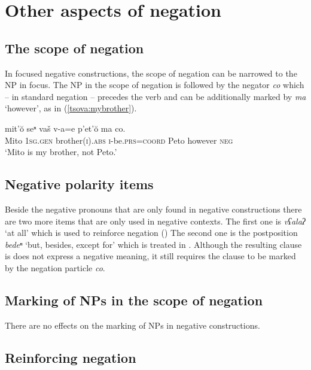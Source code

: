 \documentclass[output=paper,%
colorlinks,citecolor=brown,
showindex
]{langscibook}
\begin{document}
\section{Other aspects of negation}
\label{tsova:otheraspects}
\subsection{The scope of negation}
\label{tsova:scope}

In focused negative constructions, the scope of negation can be narrowed to the NP in focus. The NP in the scope of negation is followed by the negator \textit{co} which – in standard negation –  precedes the verb and can be additionally marked by \textit{ma}  `however', as in (\ref{tsova:mybrother}).

\ea	\label{tsova:mybrother}
\gll 	mit'ŏ seⁿ vaš  v-a=e p'et'ŏ ma co.\\  
	Mito \textsc{1sg.gen} brother\textsc{(i).abs} \textsc{i}-be.\textsc{prs=coord} Peto however \textsc{neg}\\
\glt `Mito is my brother, not Peto.' \citep[210]{HoliskyGagua1994} 
\z

\subsection{Negative polarity items}

Beside the negative pronouns that are only found in negative constructions there are two more items that are only used in negative contexts. The first one is \textit{vʕalaʔ} `at all' which is used to reinforce negation () The second one is the postposition \textit{bedeⁿ} `but, besides, except for' which is treated in . Although the resulting clause is does not express a negative meaning, it still requires the clause to be marked by the negation particle \textit{co}. 

\subsection{Marking of NPs in the scope of negation}

There are no effects on the marking of NPs in negative constructions. 

\subsection{Reinforcing negation}
\label{tsova:reinforcing}
\largerpage
\end{document}

